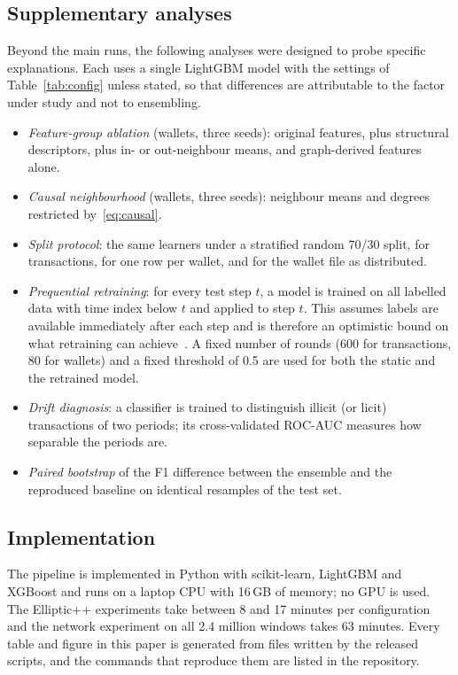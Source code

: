 \subsection{Supplementary analyses}
Beyond the main runs, the following analyses were designed to probe specific explanations. Each uses a single LightGBM model with the settings of Table~\ref{tab:config} unless stated, so that differences are attributable to the factor under study and not to ensembling.
\begin{itemize}
\item \emph{Feature-group ablation} (wallets, three seeds): original features, plus structural descriptors, plus in- or out-neighbour means, and graph-derived features alone.
\item \emph{Causal neighbourhood} (wallets, three seeds): neighbour means and degrees restricted by~\eqref{eq:causal}.
\item \emph{Split protocol}: the same learners under a stratified random 70/30 split, for transactions, for one row per wallet, and for the wallet file as distributed.
\item \emph{Prequential retraining}: for every test step $t$, a model is trained on all labelled data with time index below $t$ and applied to step $t$. This assumes labels are available immediately after each step and is therefore an optimistic bound on what retraining can achieve~\cite{dalpozzolo2018}. A fixed number of rounds (600 for transactions, 80 for wallets) and a fixed threshold of 0.5 are used for both the static and the retrained model.
\item \emph{Drift diagnosis}: a classifier is trained to distinguish illicit (or licit) transactions of two periods; its cross-validated ROC-AUC measures how separable the periods are.
\item \emph{Paired bootstrap} of the F1 difference between the ensemble and the reproduced baseline on identical resamples of the test set.
\end{itemize}

\subsection{Implementation}
The pipeline is implemented in Python with scikit-learn, LightGBM and XGBoost and runs on a laptop CPU with 16\,GB of memory; no GPU is used. The Elliptic++ experiments take between 8 and 17 minutes per configuration and the network experiment on all 2.4 million windows takes 63 minutes. Every table and figure in this paper is generated from files written by the released scripts, and the commands that reproduce them are listed in the repository.
